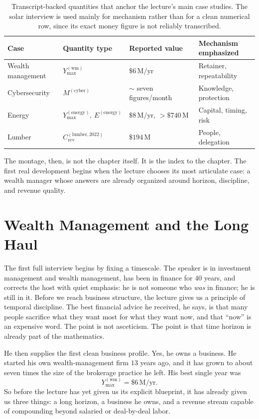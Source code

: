 \begin{table}[h]
\centering
\begin{tabular}{|l|l|l|l|}
\hline
Case & Quantity type & Reported value & Mechanism emphasized \\
\hline
Wealth management & \(Y_{\max}^{(\mathrm{wm})}\) & \(\$6\,\mathrm{M/yr}\) & Retainer, repeatability \\
Cybersecurity & \(M^{(\mathrm{cyber})}\) & \(\sim\) seven figures/month & Knowledge, protection \\
Energy & \(Y_{\max}^{(\mathrm{energy})},\,E^{(\mathrm{energy})}\) & \(\$8\,\mathrm{M/yr},\,>\$740\,\mathrm{M}\) & Capital, timing, risk \\
Lumber & \(C_{\text{rev}}^{(\mathrm{lumber},2022)}\) & \(\$194\,\mathrm{M}\) & People, delegation \\
\hline
\end{tabular}
\caption{Transcript-backed quantities that anchor the lecture's main case studies. The solar interview is used mainly for mechanism rather than for a clean numerical row, since its exact money figure is not reliably transcribed.}
\end{table}

The montage, then, is not the chapter itself. It is the index to the chapter. The first real development begins when the lecture chooses its most articulate case: a wealth manager whose answers are already organized around horizon, discipline, and revenue quality.

\section{Wealth Management and the Long Haul}

The first full interview begins by fixing a timescale. The speaker is in investment management and wealth management, has been in finance for \(40\) years, and corrects the host with quiet emphasis: he is not someone who \emph{was} in finance; he is still in it. Before we reach business structure, the lecture gives us a principle of temporal discipline. The best financial advice he received, he says, is that many people sacrifice what they want most for what they want now, and that ``now'' is an expensive word. The point is not asceticism. The point is that time horizon is already part of the mathematics.

He then supplies the first clean business profile. Yes, he owns a business. He started his own wealth-management firm \(13\) years ago, and it has grown to about seven times the size of the brokerage practice he left. His best single year was
\[
Y_{\max}^{(\mathrm{wm})}=\$6\,\mathrm{M/yr}.
\]
So before the lecture has yet given us its explicit blueprint, it has already given us three things: a long horizon, a business he owns, and a revenue stream capable of compounding beyond salaried or deal-by-deal labor.

